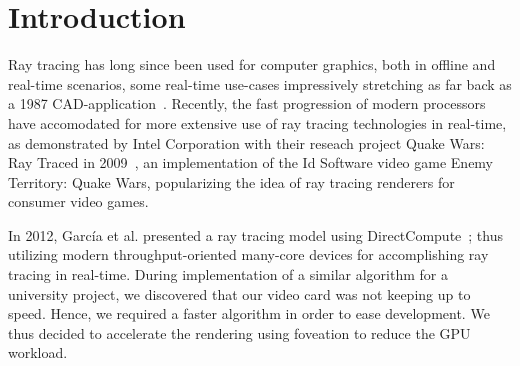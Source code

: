 \section{Introduction}
Ray tracing has long since been used for computer graphics, both in offline and real-time scenarios, some real-time use-cases impressively stretching as far back as a 1987 CAD-application~\cite{stay87}.
Recently, the fast progression of modern processors have accomodated for more extensive use of ray tracing technologies in real-time, as demonstrated by Intel Corporation with their reseach project Quake Wars: Ray Traced in 2009~\cite{pohl09}, an implementation of the Id Software video game Enemy Territory: Quake Wars, popularizing the idea of ray tracing renderers for consumer video games.

In 2012, Garc\'ia et al. presented a ray tracing model using DirectCompute~\cite{garcia12}; thus utilizing modern throughput-oriented many-core devices for accomplishing ray tracing in real-time.
During implementation of a similar algorithm for a university project, we discovered that our video card was not keeping up to speed.
Hence, we required a faster algorithm in order to ease development.
We thus decided to accelerate the rendering using foveation to reduce the GPU workload.

